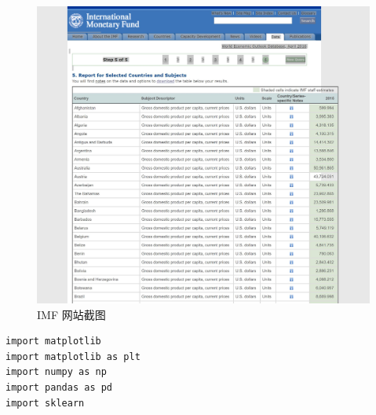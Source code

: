 \documentclass[UTF8]{ctexart}
\begin{document}
\begin{figure}[H]
\centering
\includegraphics[width = 6in]{imf.JPG}
\caption{IMF 网站截图}
\end{figure}

\begin{lstlisting}
import matplotlib
import matplotlib as plt
import numpy as np
import pandas as pd
import sklearn


\end{lstlisting}
\end{document}
